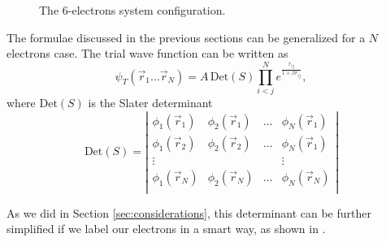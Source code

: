 \documentclass[a4paper,twoside,11pt]{book}
\begin{document}
\begin{figure}[H]
	\centering
	\caption{The 6-electrons system configuration.}
	\label{eq:sketch_6e}
\end{figure}

The formulae discussed in the previous sections can be generalized for a $N$ electrons case. The trial wave function can be written as
\begin{equation}
	\psi_T(\vec{r}_1 \dots \vec{r}_N)= A \,  \text{Det}(S) \prod_{i<j}^N e^{\frac{r_{ij}}{1+\beta r_{ij}}},
\end{equation}
where $\text{Det}(S)$ is the Slater determinant
\begin{equation}
	\text{Det}(S)= \left|
	\begin{matrix}
		\phi_1(\vec{r}_1) & \phi_2(\vec{r}_1) & \dots & \phi_N(\vec{r}_1) \\
		\phi_1(\vec{r}_2) & \phi_2(\vec{r}_2) & \dots & \phi_N(\vec{r}_1) \\
		\vdots &  &  & \vdots \\
		\phi_1(\vec{r}_N) & \phi_2(\vec{r}_N) & \dots & \phi_N(\vec{r}_N) \\
	\end{matrix}
	\right|
\end{equation}

As we did in Section \ref{sec:considerations}, this determinant can be further simplified if we label our electrons in a smart way, as shown in \cite{Hjorth-Jensen2014}.
\end{document}
